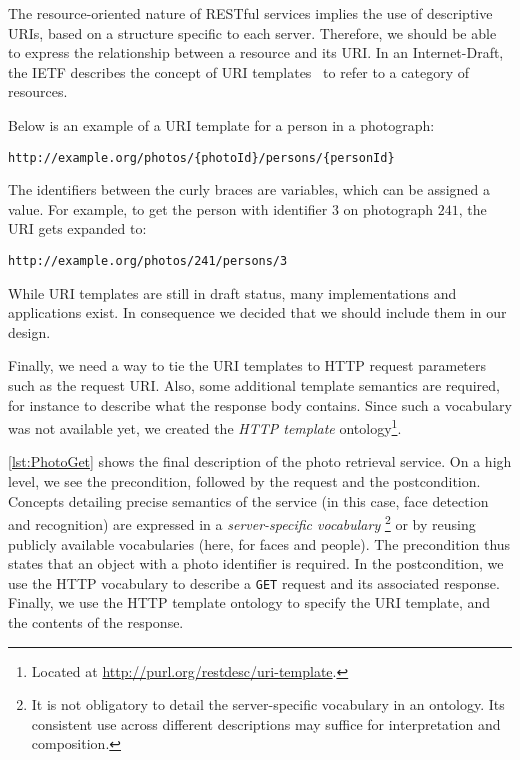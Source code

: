 \documentclass[runningheads,a4paper, twocolumn]{llncs}
\begin{document}
The resource-oriented nature of RESTful services implies the use of descriptive URIs, based on a structure specific to each server. Therefore, we should be able to express the relationship between a resource and its URI. In an Internet-Draft, the IETF describes the concept of URI templates~\cite{URITemplate} to refer to a category of resources.

\needspace{2em} Below is an example of a URI template for a person in a photograph:
\begin{Verbatim}
http://example.org/photos/{photoId}/persons/{personId}
\end{Verbatim}
The identifiers between the curly braces are variables, which can be assigned a value. For example, to get the person with identifier $3$ on photograph $241$, the URI gets expanded to:
\begin{Verbatim}
http://example.org/photos/241/persons/3
\end{Verbatim}

While URI templates are still in draft status, many implementations and applications exist. In consequence we decided that we should include them in our design.

Finally, we need a way to tie the URI templates to HTTP request parameters such as the request URI. Also, some additional template semantics are required, for instance to describe what the response body contains. Since such a vocabulary was not available yet, we created the \emph{HTTP template} ontology\footnote{Located at {\fontsize{8}{10}\url{http://purl.org/restdesc/uri-template}}.}.

\autoref{lst:PhotoGet} shows the final description of the photo retrieval service. On a high level, we see the precondition, followed by the request and the postcondition. Concepts detailing precise semantics of the service (in this case, face detection and recognition) are expressed in a \emph{server-specific vocabulary}
\footnote{It is not obligatory to detail the server-specific vocabulary in an ontology. Its consistent use across different descriptions may suffice for interpretation and composition.} or by reusing publicly available vocabularies (here, for faces and people).
The precondition thus states that an object with a photo identifier is required. In the postcondition, we use the HTTP vocabulary to describe a \Verb!GET! request and its associated response. Finally, we use the HTTP template ontology to specify the URI template, and the contents of the response.
\end{document}
